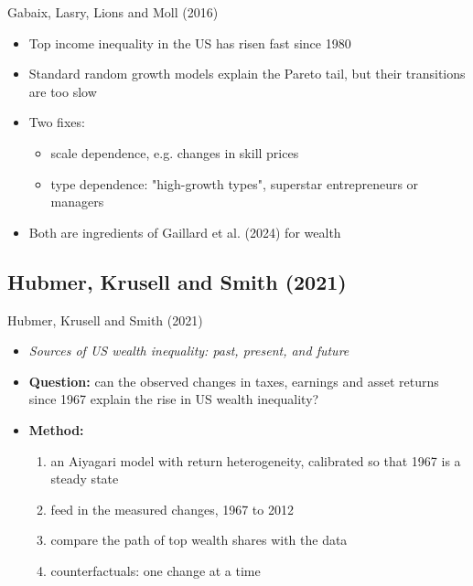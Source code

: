 \documentclass[10pt,english,10pt]{beamer}
\begin{document}
\begin{frame}{Gabaix, Lasry, Lions and Moll (2016)}
\begin{itemize}
\item Top income inequality in the US has risen fast since 1980
\item Standard random growth models explain the Pareto tail, but their transitions are too slow
\item Two fixes:
\begin{itemize}
\item scale dependence, e.g. changes in skill prices
\item type dependence: "high-growth types", superstar entrepreneurs or managers
\end{itemize}
\item Both are ingredients of Gaillard et al. (2024) for wealth
\end{itemize}
\end{frame}

\subsection{Hubmer, Krusell and Smith (2021)}

\begin{frame}{Hubmer, Krusell and Smith (2021)}
\begin{itemize}
\item \emph{Sources of US wealth inequality: past, present, and future}
\item \textbf{Question:} can the observed changes in taxes, earnings and asset returns since 1967 explain the rise in US wealth inequality?
\item \textbf{Method:}
\begin{enumerate}
\item an Aiyagari model with return heterogeneity, calibrated so that 1967 is a steady state
\item feed in the measured changes, 1967 to 2012
\item compare the path of top wealth shares with the data
\item counterfactuals: one change at a time
\end{enumerate}
\end{itemize}
\end{frame}
\end{document}
